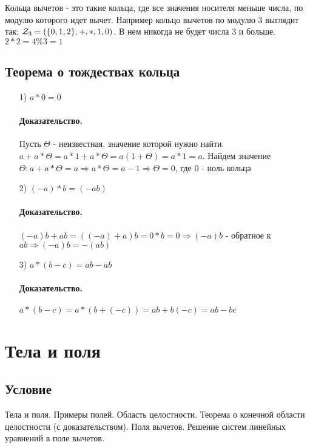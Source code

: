 \documentclass{report}
\begin{document}
\medskip

Кольца вычетов - это такие кольца, где все значения носителя меньше числа, по модулю
которого идет вычет. Например кольцо вычетов по модулю 3 выглядит так: ${\cal Z}_{3} = (\{0,1,2\}, +, *, 1, 0)$.
В нем никогда не будет числа 3 и больше. $2 * 2 = 4 \% 3 = 1$

\medskip

\subsection{Теорема о тождествах кольца}
\begin{itemize}
    \item[1)] $a * 0 = 0$
        \paragraph*{Доказательство.} Пусть $\Theta$ - неизвестная, значение которой нужно найти.\newline
        $a + a * \Theta = a * 1 + a*\Theta = a(1 + \Theta) = a * 1 = a$.\newline
        Найдем значение $\Theta: a + a*\Theta = a \Rightarrow a*\Theta = a - 1 \Rightarrow \Theta = 0$, где 0 - ноль кольца
    \item[2)] $(-a)*b = (-ab)$
        \paragraph*{Доказательство.}
        $(-a)b + ab = ((-a) + a)b = 0 * b = 0 \Rightarrow (-a)b$ - обратное к $ab \Rightarrow (-a)b = -(ab)$
    \item[3)] $a * (b - c) = ab - ab$
        \paragraph*{Доказательство.}
        $a * (b - c) = a * (b + (-c)) = ab + b(-c) = ab - bc$
\end{itemize}

\newpage

\section{Тела и поля}
\subsection{Условие}
Тела и поля. Примеры полей. Область целостности. Теорема о конечной области
целостности (с доказательством). Поля вычетов. Решение систем линейных уравнений
в поле вычетов.
\end{document}
